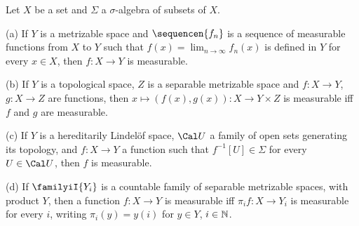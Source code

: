 
 Let $X$ be a set and $\Sigma$ a
$\sigma$-algebra of subsets of $X$.

(a) If $Y$ is a metrizable space and $\sequencen{f_n}$ is a
sequence of measurable functions from $X$ to $Y$ such that
$f(x)=\lim_{n\to\infty}f_n(x)$ is defined in $Y$ for every $x\in X$,
then $f:X\to Y$ is measurable.

(b) If $Y$ is a topological space, $Z$ is a
separable metrizable space and $f:X\to Y$, $g:X\to Z$ are
functions, then $x\mapsto (f(x),g(x)):X\to Y\times Z$ is measurable iff
$f$ and $g$ are measurable.

(c) If $Y$ is a hereditarily Lindel\"of space, $\Cal U$ a
family of open sets generating its topology, and $f:X\to Y$ a
function such that $f^{-1}[U]\in\Sigma$ for every $U\in\Cal U$, then $f$
is measurable.

(d) If $\familyiI{Y_i}$ is a countable family of separable metrizable
spaces, with product $Y$, then a function $f:X\to Y$ is measurable iff
$\pi_if:X\to Y_i$ is measurable for every $i$, writing $\pi_i(y)=y(i)$
for $y\in Y$, $i\in\Bbb N$.

